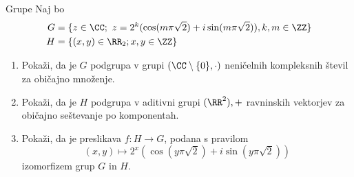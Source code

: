 \begin{frame}{Grupe}
	Naj bo
	\begin{align*}
		G &=\{z \in \CC;~z=2^k(\cos (m \pi \sqrt{2})+i \sin (m \pi \sqrt{2})), k,m \in \ZZ\} \\
		H &=\{(x,y) \in \RR_2; x,y \in \ZZ\}
	\end{align*}
	\begin{enumerate}
		\item
			Pokaži, da je $G$ podgrupa v grupi $(\CC \setminus \{0\}, \cdot)$
			neničelnih kompleksnih števil za običajno množenje.
		\item
			Pokaži, da je $H$ podgrupa v aditivni grupi $(\RR^2),+$
			ravninskih vektorjev za običajno seštevanje po komponentah.
		\item
			Pokaži, da je preslikava $f:H\to G$, podana s pravilom
			$$(x,y)\mapsto 2^x(\cos (y \pi \sqrt{2})+i \sin (y \pi \sqrt{2}))$$
			izomorfizem grup $G$ in $H$.
	\end{enumerate}
\end{frame}
